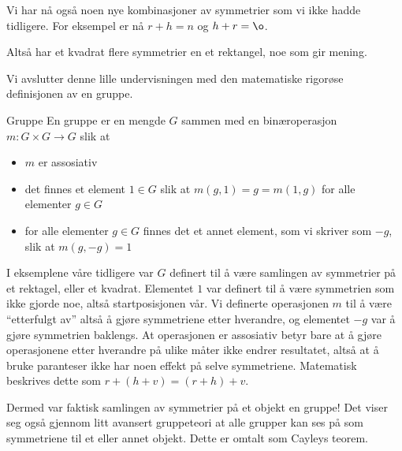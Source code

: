 Vi har nå også noen nye kombinasjoner av symmetrier som vi ikke hadde tidligere. 
For eksempel er nå $r+h = n$ og $h+r=\o$. 

Altså har et kvadrat flere symmetrier en et rektangel, 
noe som gir mening. 

Vi avslutter denne lille undervisningen med den matematiske rigorøse definisjonen av en gruppe. 

\begin{definition}{Gruppe}
En gruppe er en mengde $G$ sammen med en binæroperasjon $m:G\times G\rightarrow G$ slik at 
\begin{itemize}
    \item $m$ er assosiativ
    \item det finnes et element $1\in G$ slik at $m(g,1)=g=m(1,g)$ for alle elementer $g\in G$
    \item for alle elementer $g\in G$ finnes det et annet element, som vi skriver som $-g$, slik at $m(g, -g)=1$
\end{itemize}
\end{definition}

I eksemplene våre tidligere var $G$ definert til å være samlingen av symmetrier på et rektagel, 
eller et kvadrat. 
Elementet $1$ var definert til å være symmetrien som ikke gjorde noe, 
altså startposisjonen vår. 
Vi definerte operasjonen $m$ til å være ``etterfulgt av'' altså å gjøre symmetriene etter hverandre, 
og elementet $-g$ var å gjøre symmetrien baklengs. 
At operasjonen er assosiativ betyr bare at å gjøre operasjonene etter hverandre på ulike måter ikke endrer resultatet, 
altså at å bruke paranteser ikke har noen effekt på selve symmetriene. 
Matematisk beskrives dette som $r+(h+v)=(r+h)+v$. 

Dermed var faktisk samlingen av symmetrier på et objekt en gruppe! 
Det viser seg også gjennom litt avansert gruppeteori at alle grupper kan ses på som symmetriene til et eller annet objekt. 
Dette er omtalt som Cayleys teorem. 

